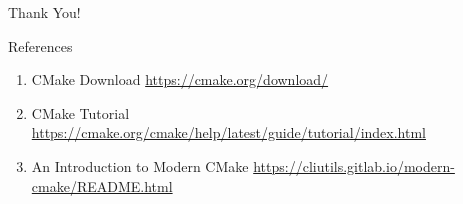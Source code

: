 \documentclass{beamer}
\begin{document}
\begin{frame}
    \centering
    \Huge{Thank You!}
\end{frame}

\begin{frame}{References}
  \begin{enumerate}
    \item CMake Download \href{https://cmake.org/download/}{https://cmake.org/download/}
    \item CMake Tutorial \href{https://cmake.org/cmake/help/latest/guide/tutorial/index.html}{https://cmake.org/cmake/help/latest/guide/tutorial/index.html}
    \item An Introduction to Modern CMake \href{https://cliutils.gitlab.io/modern-cmake/README.html}{https://cliutils.gitlab.io/modern-cmake/README.html}
  \end{enumerate}
\end{frame}
\end{document}
